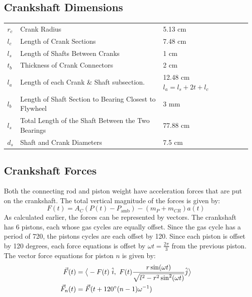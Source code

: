 \documentclass[10pt,a4paper]{article}
\begin{document}
\subsection*{Crankshaft Dimensions}
\begin{table}[H]
\begin{tabular}{lllll}
$r_c$ & Crank Radius & 5.13 cm  \\
 $l_c$& Length of Crank Sections & 7.48 cm   \\
 $l_s$& Length of Shafts Between Cranks & 1 cm   \\
 $t_b$& Thickness of Crank Connectors & 2 cm   \\
 $l_a$& Length of each Crank \& Shaft subsection. & 12.48 cm $l_a = l_s + 2t + l_c$  \\
 $l_b$& Length of Shaft Section to Bearing Closest to Flywheel &  3 mm  \\
$l_s$ & Total Length of the Shaft Between the Two Bearings &  77.88 cm  \\
$d_s$& Shaft and Crank Diameters & 7.5 cm
\end{tabular}
\end{table}
\subsection*{Crankshaft Forces}
Both the connecting rod and piston weight have acceleration forces that are put on the crankshaft. The total vertical magnitude of the forces is given by:
$$F(t) = A_C (P(t) - P_{\text{amb}}) - (m_P+m_{CR})a(t)$$
As calculated earlier, the forces can be represented by vectors. The crankshaft has 6 pistons, each whose gas cycles are equally offset. Since the gas cycle has a period of 720\degree , the pistons cycles are each offset by 120\degree . Since each piston is offset by 120 degrees, each force equations is offset by $\omega t = \frac{2 \pi}{3}$ from the previous piston. The vector force equations for piston $n$ is given by:
\begin{align*}
\vec{F}(t) &= \big \langle -F(t)\ \hat{i},\ F(t) \frac{r \sin(\omega t)}{\sqrt{l^2 - r^2 \sin^2(\omega t)}}  \hat{j} \big \rangle\\
\vec{F}_n(t) &= \vec{F}(t + 120 \degree (n-1)\omega^{-1})
\end{align*} 
\end{document}
